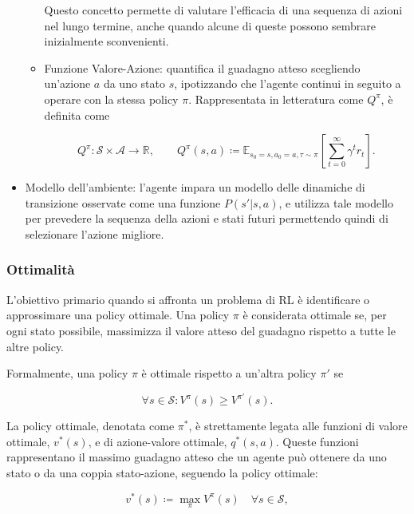 \begin{itemize}
\begin{itemize}
        Questo concetto permette di valutare l’efficacia di una sequenza di azioni nel lungo termine, anche quando alcune di queste possono sembrare inizialmente sconvenienti.

        \item Funzione Valore-Azione: quantifica il guadagno atteso scegliendo un'azione $a$ da uno stato $s$, ipotizzando che l'agente continui in seguito a operare con la stessa policy $\pi$. Rappresentata in letteratura come $Q^\pi$, è definita come

        \begin{equation}
            Q^\pi: \mathcal{S} \times \mathcal{A} \to \mathbb{R}, \qquad Q^\pi(s, a) \coloneqq \mathbb{E}_{s_0=s, a_0=a, \tau \sim \pi} \left[ \sum_{t=0}^{\infty} \gamma^t r_t\right].
        \end{equation}
    \end{itemize}
    
    \item Modello dell'ambiente: l'agente impara un modello delle dinamiche di transizione osservate come una funzione $P(s' | s, a)$, e utilizza tale modello per prevedere la sequenza della azioni e stati futuri permettendo quindi di selezionare l'azione migliore. 
\end{itemize}

\subsubsection{Ottimalità}

L'obiettivo primario quando si affronta un problema di RL è identificare o approssimare una policy ottimale. Una policy $\pi$ è considerata ottimale se, per ogni stato possibile, massimizza il valore atteso del guadagno rispetto a tutte le altre policy.

Formalmente, una policy $\pi$ è ottimale rispetto a un'altra policy $\pi'$ se

\begin{equation}
    \forall s \in \mathcal{S}: V^\pi(s) \ge V^{\pi'}(s).
\end{equation}

La policy ottimale, denotata come $\pi^\ast$, è strettamente legata alle funzioni di valore ottimale, $v^\ast(s)$, e di azione-valore ottimale, $q^\ast(s, a)$. Queste funzioni rappresentano il massimo guadagno atteso che un agente può ottenere da uno stato o da una coppia stato-azione, seguendo la policy ottimale:

\begin{equation}
    v^*(s) \coloneqq \max_\pi V^\pi(s) \quad \forall s \in \mathcal{S},
\end{equation}

